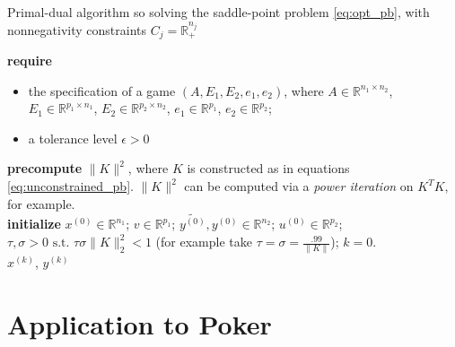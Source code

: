 \documentclass[a4paper,9pt,journal]{IEEEtran}
\begin{document}
\begin{algorithm}[htb]
  \caption{Primal-dual algorithm so solving the saddle-point problem \eqref{eq:opt_pb}, with nonnegativity constraints $C_j = \mathbb{R}^{n_j}_+$}
  \textbf{require}
  \begin{itemize}
    \item the specification of a game $(A, E_1, E_2, e_1, e_2)$, where $A \in \mathbb{R}^{n_1 \times n_2}$,
  $E_1 \in \mathbb{R}^{p_1 \times n_1}$, $E_2 \in \mathbb{R}^{p_2 \times n_2}$, $e_1 \in \mathbb{R}^{p_1}$, $e_2 \in \mathbb{R}^{p_2}$;
      \item a tolerance level $\epsilon > 0$
  \end{itemize}
  \textbf{precompute} $\|K\|^2$, where $K$ is constructed as in equations \eqref{eq:unconstrained_pb}. $\|K\|^2$ can be computed via a \textit{power iteration} on $K^TK$, for example.\\
  \textbf{initialize}
  $x^{(0)} \in \mathbb{R}^{n_1}$; $v \in \mathbb{R}^{p_1}$; $\tilde{y^{(0)}}, y^{(0)} \in \mathbb{R}^{n_2}$; $u^{(0)} \in \mathbb{R}^{p_2}$; 
  $\tau, \sigma > 0 \text{ s.t. }\tau\sigma \|K\|_2^2 < 1$ (for example take $\tau = \sigma = \frac{.99}{\|K\|}$); $k = 0$.\\
   \Return $x^{(k)}$, $y^{(k)}$
  \label{Tab:algo_simplified}
\end{algorithm}


\section{Application to Poker}
\end{document}
